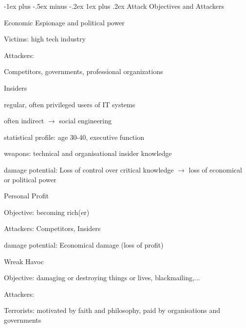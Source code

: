 \documentclass[a4paper]{article}
\makeatletter
\renewcommand{\subsubsection}{\@startsection{subsubsection}{3}{0mm}%
                {-1ex plus -.5ex minus -.2ex}%
                {1ex plus .2ex}%
                {\normalfont\small\bfseries}}
\makeatother
\begin{document}
\begin{multicols}{3}
    \subsubsection{Attack Objectives and Attackers}
    \begin{itemize*}
        \item Economic Espionage and political power
        \begin{itemize*}
            \item Victims: high tech industry
            \item Attackers:
            \begin{itemize*}
                \item Competitors, governments, professional organizations
                \item Insiders
                \item regular, often privileged users of IT systems
            \end{itemize*}
            \item often indirect $\rightarrow$ social engineering
            \item statistical profile: age 30-40, executive function
            \item weapons: technical and organisational insider knowledge
            \item damage potential: Loss of control over critical knowledge $\rightarrow$ loss of economical or political power
        \end{itemize*}
        \item Personal Profit
        \begin{itemize*}
            \item Objective: becoming rich(er)
            \item Attackers: Competitors, Insiders
            \item damage potential: Economical damage (loss of profit)
        \end{itemize*}
        \item Wreak Havoc
        \begin{itemize*}
            \item Objective: damaging or destroying things or lives, blackmailing,...
            \item Attackers:
            \begin{itemize*}
                \item Terrorists: motivated by faith and philosophy, paid by organisations and governments

\end{itemize*}
\end{itemize*}
\end{itemize*}
\end{multicols}
\end{document}
